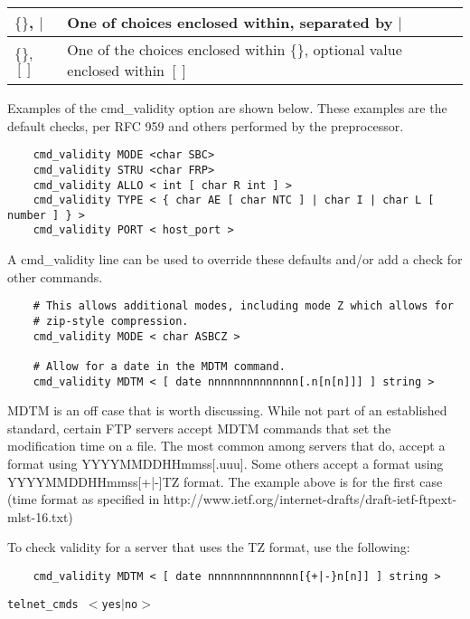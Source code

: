 \documentclass[english]{report}
\newcounter{slistnum}
\newenvironment{slist}
{ \begin{list}{ {\bf \arabic{slistnum}.} }{\usecounter{slistnum} } }
{ \end{list} }
\begin{document}
\begin{slist}
\begin{center}
\begin{tabular}{| l | p{3in} |}
\hline
$\{\}$, $|$ & One of choices enclosed within, separated by $|$ \\

\hline
$\{\}$, $[]$ & One of the choices enclosed within $\{\}$, optional value enclosed within $[]$ \\

\hline
\end{tabular}
\end{center}

Examples of the cmd\_validity option are shown below.  These examples are the
default checks, per RFC 959 and others performed by the preprocessor.

\begin{verbatim}
    cmd_validity MODE <char SBC>
    cmd_validity STRU <char FRP>
    cmd_validity ALLO < int [ char R int ] >
    cmd_validity TYPE < { char AE [ char NTC ] | char I | char L [ number ] } >
    cmd_validity PORT < host_port >
\end{verbatim}

A cmd\_validity line can be used to override these defaults and/or add a check
for other commands.

\begin{verbatim}
    # This allows additional modes, including mode Z which allows for
    # zip-style compression.
    cmd_validity MODE < char ASBCZ >
    
    # Allow for a date in the MDTM command.
    cmd_validity MDTM < [ date nnnnnnnnnnnnnn[.n[n[n]]] ] string >
\end{verbatim}

MDTM is an off case that is worth discussing.  While not part of an established
standard, certain FTP servers accept MDTM commands that set the modification
time on a file.  The most common among servers that do, accept a format using
YYYYMMDDHHmmss[.uuu].  Some others accept a format using YYYYMMDDHHmmss[+|-]TZ
format.  The example above is for the first case (time format as specified in
http://www.ietf.org/internet-drafts/draft-ietf-ftpext-mlst-16.txt)

To check validity for a server that uses the TZ format, use the following:

\begin{verbatim}
    cmd_validity MDTM < [ date nnnnnnnnnnnnnn[{+|-}n[n]] ] string >
\end{verbatim}

\item \texttt{telnet\_cmds $<$yes$|$no$>$}


\end{slist}
\end{document}
